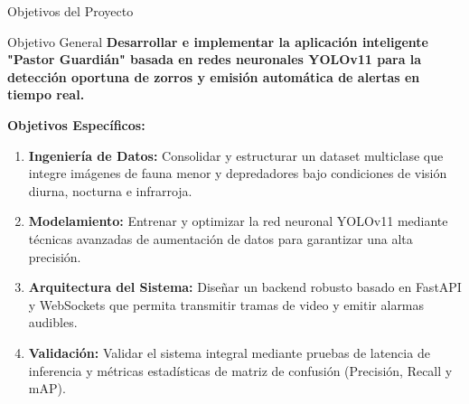 \documentclass[10pt,aspectratio=169]{beamer}
\begin{document}
\begin{frame}{Objetivos del Proyecto}
  \begin{block}{Objetivo General}
    \normalsize \bfseries \color{unapblue}
    Desarrollar e implementar la aplicación inteligente "Pastor Guardián" basada en redes neuronales YOLOv11 para la detección oportuna de zorros y emisión automática de alertas en tiempo real.
  \end{block}
  
  \vspace{0.2cm}
  \textbf{Objetivos Específicos:}
  \begin{enumerate}
    \small
    \item \textbf{Ingeniería de Datos:} Consolidar y estructurar un dataset multiclase que integre imágenes de fauna menor y depredadores bajo condiciones de visión diurna, nocturna e infrarroja.
    \item \textbf{Modelamiento:} Entrenar y optimizar la red neuronal YOLOv11 mediante técnicas avanzadas de aumentación de datos para garantizar una alta precisión.
    \item \textbf{Arquitectura del Sistema:} Diseñar un backend robusto basado en FastAPI y WebSockets que permita transmitir tramas de video y emitir alarmas audibles.
    \item \textbf{Validación:} Validar el sistema integral mediante pruebas de latencia de inferencia y métricas estadísticas de matriz de confusión (Precisión, Recall y mAP).
  \end{enumerate}
\end{frame}
\end{document}
